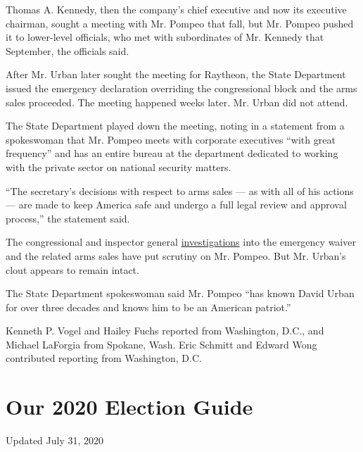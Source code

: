 Thomas A. Kennedy, then the company's chief executive and now its
executive chairman, sought a meeting with Mr. Pompeo that fall, but Mr.
Pompeo pushed it to lower-level officials, who met with subordinates of
Mr. Kennedy that September, the officials said.

After Mr. Urban later sought the meeting for Raytheon, the State
Department issued the emergency declaration overriding the congressional
block and the arms sales proceeded. The meeting happened weeks later.
Mr. Urban did not attend.

The State Department played down the meeting, noting in a statement from
a spokeswoman that Mr. Pompeo meets with corporate executives ``with
great frequency'' and has an entire bureau at the department dedicated
to working with the private sector on national security matters.

``The secretary's decisions with respect to arms sales --- as with all
of his actions --- are made to keep America safe and undergo a full
legal review and approval process,'' the statement said.

The congressional and inspector general
\href{https://www.nytimes.com/2020/05/18/us/politics/pompeo-trump-linick-inspector-general-firing.html}{investigations}
into the emergency waiver and the related arms sales have put scrutiny
on Mr. Pompeo. But Mr. Urban's clout appears to remain intact.

The State Department spokeswoman said Mr. Pompeo ``has known David Urban
for over three decades and knows him to be an American patriot.''

Kenneth P. Vogel and Hailey Fuchs reported from Washington, D.C., and
Michael LaForgia from Spokane, Wash. Eric Schmitt and Edward Wong
contributed reporting from Washington, D.C.

\hypertarget{our-2020-election-guide}{%
\section{Our 2020 Election Guide}\label{our-2020-election-guide}}

Updated July 31, 2020

